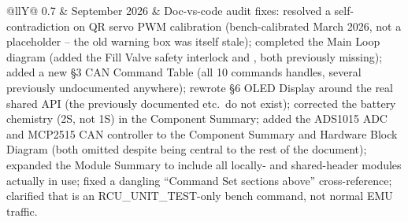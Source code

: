 ﻿\documentclass[11pt,letterpaper]{article}
\begin{document}
\begin{center}
\begin{tabularx}{\textwidth}{@{}llY@{}}
0.7 & September 2026 & Doc-vs-code audit fixes: resolved a self-contradiction on QR servo
                   PWM calibration (bench-calibrated March 2026, not a placeholder -- the old
                   warning box was itself stale); completed the Main Loop diagram (added the
                   Fill Valve safety interlock and , both previously missing);
                   added a new \S3 CAN Command Table (all 10 commands 
                   handles, several previously undocumented anywhere); rewrote \S6 OLED
                   Display around the real shared  API (the previously
                   documented  etc.\ do not exist); corrected the battery
                   chemistry (2S, not 1S) in the Component Summary; added the ADS1015 ADC and
                   MCP2515 CAN controller to the Component Summary and Hardware Block Diagram
                   (both omitted despite being central to the rest of the document); expanded
                   the Module Summary to include all locally- and shared-header modules
                   actually in use; fixed a dangling ``Command Set sections above''
                   cross-reference; clarified that  is an
                   RCU\_UNIT\_TEST-only bench command, not normal EMU traffic. \\
\bottomrule
\end{tabularx}
\end{center}
\end{document}
